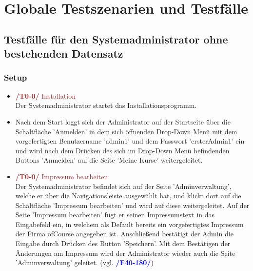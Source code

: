 \documentclass[a4paper]{scrreprt}
\newcounter{Lc}
\newcounter{Hc}
\newcommand{\resetAllCounter}{\setcounter{Lc}{0}\setcounter{Hc}{1}}
\begin{document}
\resetAllCounter
\newcommand{\Test}[1]{\stepcounter{Lc}\textcolor{Brown}{\textbf{/T\arabic{Hc}0-\arabic{Lc}0/} #1} \\}
\newcommand{\RefFuncBlue}[1]{\textcolor{Blue}{\textbf{#1}}}
\newcommand{\RefFuncGreen}[1]{\textcolor{Green}{\textbf{#1}}}
\newcommand{\RefFuncBrown}[1]{\textcolor{Brown}{\textbf{#1}}}
\chapter{Globale Testszenarien und Testfälle}
 

	\section{Testfälle für den Systemadministrator ohne bestehenden Datensatz}
		\subsection{Setup}
			\begin{itemize}
				\item \Test{Installation} 
			     Der Systemadministrator startet das Installationsprogramm. 
						
				\item Nach dem Start loggt sich der Administrator auf der Startseite über die Schaltfläche 'Anmelden' in dem sich öffnenden Drop-Down Menü mit dem vorgefertigten Benutzername 'admin1' und dem Passwort 'ersterAdmin1' ein und wird nach dem Drücken des sich im Drop-Down Menü befindenden Buttons 'Anmelden' auf die Seite 'Meine Kurse' weitergeleitet. 
				 
				\item \Test{Impressum bearbeiten}
				 Der Systemadministrator befindet sich auf der Seite 'Adminverwaltung', welche er über die Navigationsleiste ausgewählt hat, und klickt dort auf die Schaltfläche 'Impressum bearbeiten' und wird auf diese weitergeleitet. Auf der Seite 'Impressum bearbeiten' fügt er seinen Impressumstext in das Eingabefeld ein, in welchem als Default bereits ein vorgefertigtes Impressum der Firma ofCourse angegeben ist. Anschließend bestätigt der Admin die Eingabe durch Drücken des Button 'Speichern'. Mit dem Bestätigen der Änderungen am Impressum wird der Administrator wieder auch die Seite 'Adminverwaltung' geleitet. (vgl. \RefFuncBlue{/F40-180/})
				 
				
			\end{itemize}		
				
\end{document}
